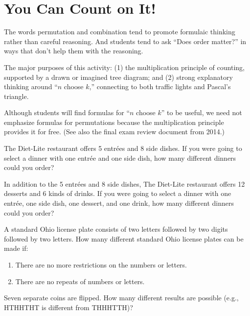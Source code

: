 \newpage
\section{You Can Count on It!}\label{A:countOnIt}
\begin{teachingnote}
 The words permutation and combination tend to promote formulaic thinking rather than careful reasoning.  And students tend to ask ``Does order matter?'' in ways that don't help them with the reasoning. 

The major purposes of this activity: (1) the multiplication principle of counting, supported by a drawn or imagined tree diagram; and (2) strong explanatory thinking around ``$n$ choose $k$,'' connecting to both traffic lights and Pascal's triangle.  

Although students will find formulas for ``$n$ choose $k$'' to be useful, we need not emphasize formulas for permutations because the multiplication principle provides it for free.   (See also the final exam review document from 2014.)
\end{teachingnote}

\begin{prob}
The Diet-Lite restaurant offers 5 entr\'ees and 8 side dishes.   If you were going to select a dinner with one
entr\'ee and one side dish, how many different dinners could you order?
\end{prob}

\begin{prob}
In addition to the 5 entr\'ees and 8 side dishes, The Diet-Lite restaurant offers 12 desserts
and 6 kinds of drinks.  If you were going to select a dinner with one
entr\'ee, one side dish, one dessert, and one drink, how many different
dinners could you order?
\end{prob}

\begin{prob}
A standard Ohio license plate consists of two letters followed by two
digits followed by two letters.  How many different standard Ohio
license plates can be made if: 
\begin{enumerate}
\item There are no more restrictions on the
numbers or letters.
\item  There are no repeats of numbers or letters.
\end{enumerate}
\end{prob}

\begin{prob}
Seven separate coins are flipped.  How many different results are
possible (e.g., HTHHTHT is different from THHHTTH)?
\end{prob}

